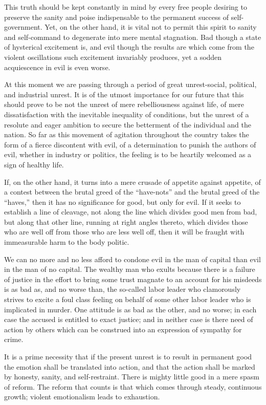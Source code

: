 \documentclass[a4paper]{amsbook}
\begin{document}
This truth should be kept constantly in mind by every free people desiring to preserve the sanity and poise indispensable to the permanent success of self-government. Yet, on the other hand, it is vital not to permit this spirit to sanity and self-command to degenerate into mere mental stagnation. Bad though a state of hysterical excitement is, and evil though the results are which come from the violent oscillations such excitement invariably produces, yet a sodden acquiescence in evil is even worse.

At this moment we are passing through a period of great unrest-social, political, and industrial unrest. It is of the utmost importance for our future that this should prove to be not the unrest of mere rebelliousness against life, of mere dissatisfaction with the inevitable inequality of conditions, but the unrest of a resolute and eager ambition to secure the betterment of the individual and the nation. So far as this movement of agitation throughout the country takes the form of a fierce discontent with evil, of a determination to punish the authors of evil, whether in industry or politics, the feeling is to be heartily welcomed as a sign of healthy life.

If, on the other hand, it turns into a mere crusade of appetite against appetite, of a contest between the brutal greed of the “have-nots” and the brutal greed of the “haves,” then it has no significance for good, but only for evil. If it seeks to establish a line of cleavage, not along the line which divides good men from bad, but along that other line, running at right angles thereto, which divides those who are well off from those who are less well off, then it will be fraught with immeasurable harm to the body politic.

We can no more and no less afford to condone evil in the man of capital than evil in the man of no capital. The wealthy man who exults because there is a failure of justice in the effort to bring some trust magnate to an account for his misdeeds is as bad as, and no worse than, the so-called labor leader who clamorously strives to excite a foul class feeling on behalf of some other labor leader who is implicated in murder. One attitude is as bad as the other, and no worse; in each case the accused is entitled to exact justice; and in neither case is there need of action by others which can be construed into an expression of sympathy for crime.

It is a prime necessity that if the present unrest is to result in permanent good the emotion shall be translated into action, and that the action shall be marked by honesty, sanity, and self-restraint. There is mighty little good in a mere spasm of reform. The reform that counts is that which comes through steady, continuous growth; violent emotionalism leads to exhaustion.
\end{document}
